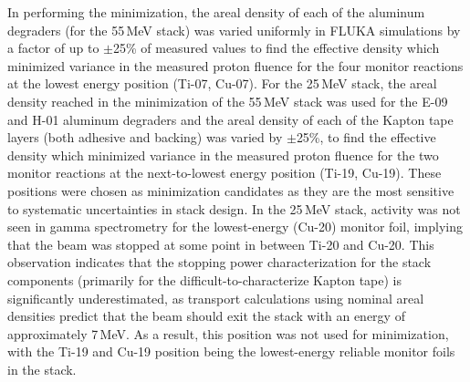 In performing the  minimization, the areal density of each of the  aluminum degraders (for the 55\,MeV stack)  was varied uniformly in FLUKA simulations  by a factor of up to $\pm$25\% of measured
values to find the effective density which minimized variance in the measured proton fluence for the four monitor reactions at the lowest energy position (Ti-07, Cu-07).
For the 25\,MeV stack, the areal density reached in the minimization of the 55\,MeV stack was used for  the E-09 and H-01 aluminum degraders
and the areal density of each of the  Kapton tape  layers (both adhesive and backing)  was 
varied 
by 
$\pm$25\%, 
to find the effective density which minimized variance in the measured proton fluence for the two monitor reactions at the next-to-lowest energy position (Ti-19, Cu-19).
These 
positions were chosen as  minimization candidates as they are the most sensitive to systematic uncertainties in stack design.
In the 25\,MeV stack, activity was not seen in gamma spectrometry for the lowest-energy (Cu-20) monitor foil, implying that the beam was stopped at some point in between Ti-20 and Cu-20.
This observation 
indicates that  the stopping power characterization
for the stack components 
(primarily for the difficult-to-characterize Kapton tape) is significantly underestimated, as transport calculations using nominal areal densities predict that the beam should exit the stack 
with an energy of approximately 7\,MeV.
As a result, this position was not used for minimization, with the Ti-19 and Cu-19 position being the lowest-energy reliable monitor foils in the stack.
% 
% 
% 

